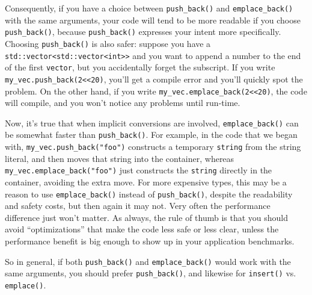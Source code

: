 Consequently, if you have a choice between \texttt{push_back()} and \texttt{emplace_back()} with the same arguments, your code will tend to be more readable if you choose \texttt{push_back()}, because \texttt{push_back()} expresses your intent more specifically. Choosing \texttt{push_back()} is also safer: suppose you have a \texttt{std::vector<std::vector<int>>} and you want to append a number to the end of the first \texttt{vector}, but you accidentally forget the subscript. If you write \texttt{my_vec.push_back(2<<20)}, you’ll get a compile error and you’ll quickly spot the problem. On the other hand, if you write \texttt{my_vec.emplace_back(2<<20)}, the code will compile, and you won’t notice any problems until run-time.

Now, it’s true that when implicit conversions are involved, \texttt{emplace_back()} can be somewhat faster than \texttt{push_back()}. For example, in the code that we began with, \texttt{my_vec.push_back("foo")} constructs a temporary \texttt{string} from the string literal, and then moves that string into the container, whereas \texttt{my_vec.emplace_back("foo")} just constructs the \texttt{string} directly in the container, avoiding the extra move. For more expensive types, this may be a reason to use \texttt{emplace_back()} instead of \texttt{push_back()}, despite the readability and safety costs, but then again it may not. Very often the performance difference just won’t matter. As always, the rule of thumb is that you should avoid “optimizations” that make the code less safe or less clear, unless the performance benefit is big enough to show up in your application benchmarks.

So in general, if both \texttt{push_back()} and \texttt{emplace_back()} would work with the same arguments, you should prefer \texttt{push_back()}, and likewise for \texttt{insert()} vs. \texttt{emplace()}.